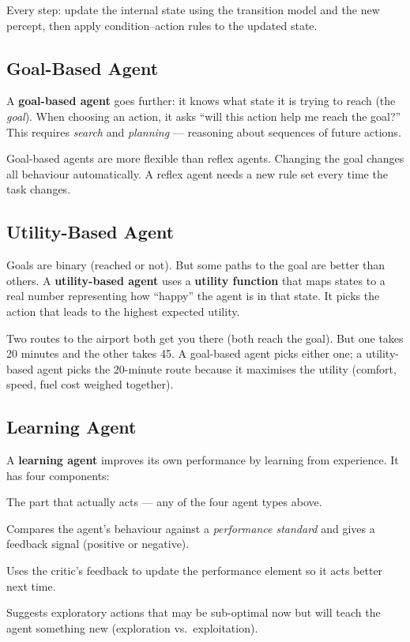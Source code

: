 \documentclass[a4paper,11pt]{article}
\newcommand{\vocab}[1]{\textbf{\color{navy}#1}}
\begin{document}
Every step: update the internal state using the transition model and the new
percept, then apply condition--action rules to the updated state.

\subsection{Goal-Based Agent}

A \vocab{goal-based agent} goes further: it knows what state it is trying to
reach (the \emph{goal}). When choosing an action, it asks ``will this action
help me reach the goal?'' This requires \emph{search} and \emph{planning} ---
reasoning about sequences of future actions.

Goal-based agents are more flexible than reflex agents. Changing the goal
changes all behaviour automatically. A reflex agent needs a new rule set every
time the task changes.

\subsection{Utility-Based Agent}

Goals are binary (reached or not). But some paths to the goal are better than
others. A \vocab{utility-based agent} uses a \vocab{utility function} that maps
states to a real number representing how ``happy'' the agent is in that state.
It picks the action that leads to the highest expected utility.

\begin{everyday}
Two routes to the airport both get you there (both reach the goal). But one
takes 20 minutes and the other takes 45. A goal-based agent picks either one;
a utility-based agent picks the 20-minute route because it maximises the
utility (comfort, speed, fuel cost weighed together).
\end{everyday}

\subsection{Learning Agent}

A \vocab{learning agent} improves its own performance by learning from experience.
It has four components:

\begin{description}[leftmargin=7.5em,style=nextline,font=\normalfont\bfseries\color{navy}]
  \item[Performance element] The part that actually acts --- any of the four
    agent types above.
  \item[Critic] Compares the agent's behaviour against a \emph{performance
    standard} and gives a feedback signal (positive or negative).
  \item[Learning element] Uses the critic's feedback to update the performance
    element so it acts better next time.
  \item[Problem generator] Suggests exploratory actions that may be sub-optimal
    now but will teach the agent something new (exploration vs.\ exploitation).
\end{description}
\end{document}
